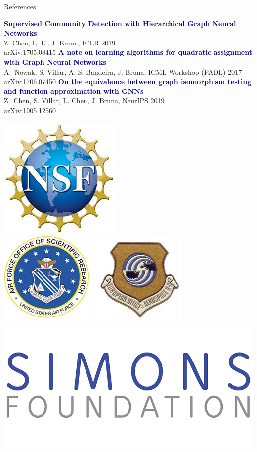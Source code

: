 \documentclass{beamer}
\begin{document}
\begin{frame}{References}


{\small 
\textcolor{darkblue}{\textbf{Supervised Community Detection with Hierarchical Graph Neural Networks}}\\
Z. Chen, L. Li, J. Bruna, ICLR 2019\\
arXiv:1705.08415
\vfill
\textcolor{darkblue}{\textbf{A note on learning algorithms for quadratic assignment with
Graph Neural Networks }}\\
 A.\ Nowak, S. Villar, A. S. Bandeira, J. Bruna, ICML Workshop (PADL) 2017 \\
arXiv:1706.07450
\vfill
\textcolor{darkblue}{\textbf{On the equivalence between graph isomorphism testing and function approximation with GNNs}}\\
 Z.\ Chen, S. Villar, L. Chen, J. Bruna, NeurIPS 2019 \\ 
arXiv:1905.12560
}

\includegraphics[height=0.19\textheight]{figs/nsf} \hfill
\includegraphics[height=0.18\textheight]{figs/eoard} \hfill
\includegraphics[height=0.19\textheight]{figs/simons}

\end{frame}
\end{document}
